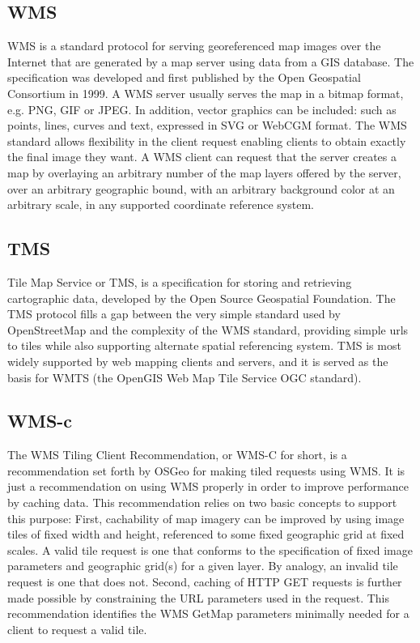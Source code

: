 \documentclass[11pt,a4paper,titlepage,oneside]{report}
\begin{document}
  \subsection{WMS}
    \acrfull{WMS} is a standard protocol for serving georeferenced map images over the Internet that are generated by a map server using data from a GIS database. The specification was developed and first published by the Open Geospatial Consortium in 1999.
    A \gls{WMS} server usually serves the map in a bitmap format, e.g. \gls{PNG}, GIF or JPEG. In addition, vector graphics can be included: such as points, lines, curves and text, expressed in SVG or WebCGM format.
    The \gls{WMS} standard allows flexibility in the client request enabling clients to obtain exactly the final image they want. A \gls{WMS} client can request that the server creates a map by overlaying an arbitrary number of the map layers offered by the server, over an arbitrary geographic bound, with an arbitrary background color at an arbitrary scale, in any supported coordinate reference system.

  \subsection{TMS}
    Tile Map Service or TMS, is a specification for storing and retrieving cartographic data, developed by the Open Source Geospatial Foundation. The TMS protocol fills a gap between the very simple standard used by OpenStreetMap and the complexity of the \gls{WMS} standard, providing simple urls to tiles while also supporting alternate spatial referencing system.
    TMS is most widely supported by web mapping clients and servers, and it is served as the basis for WMTS (the OpenGIS Web Map Tile Service \gls{OGC} standard).

  \subsection{WMS-c}
    The WMS Tiling Client Recommendation, or WMS-C for short, is a recommendation set forth by OSGeo for making tiled requests using \gls{WMS}. It is just a recommendation on using \gls{WMS} properly in order to improve performance by caching data.
    This recommendation relies on two basic concepts to support this purpose: First, cachability of map imagery can be improved by using image tiles of fixed width and height, referenced to some fixed geographic grid at fixed scales. A valid tile request is one that conforms to the specification of fixed image parameters and geographic grid(s) for a given layer. By analogy, an invalid tile request is one that does not.
    Second, caching of \gls{HTTP} GET requests is further made possible by constraining the URL parameters used in the request. This recommendation identifies the \gls{WMS} GetMap parameters minimally needed for a client to request a valid tile.
\end{document}
